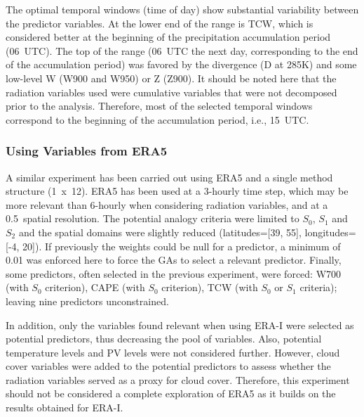 \documentclass[draft]{agujournal2019}
\begin{document}
The optimal temporal windows (time of day) show substantial variability between the predictor variables. At the lower end of the range is TCW, which is considered better at the beginning of the precipitation accumulation period (06~UTC). The top of the range (06~UTC the next day, corresponding to the end of the accumulation period) was favored by the divergence (D at 285\degree K) and some low-level W (W900 and W950) or Z (Z900). It should be noted here that the radiation variables used were cumulative variables that were not decomposed prior to the analysis. Therefore, most of the selected temporal windows correspond to the beginning of the accumulation period, i.e., 15~UTC.


\subsubsection{Using Variables from ERA5}

A similar experiment has been carried out using ERA5 and a single method structure (1~x~12). ERA5 has been used at a 3-hourly time step, which may be more relevant than 6-hourly when considering radiation variables, and at a 0.5\degree\ spatial resolution. The potential analogy criteria were limited to $S_{0}$, $S_{1}$ and $S_{2}$ and the spatial domains were slightly reduced (latitudes=[39, 55], longitudes=[-4, 20]). If previously the weights could be null for a predictor, a minimum of 0.01 was enforced here to force the GAs to select a relevant predictor. Finally, some predictors, often selected in the previous experiment, were forced: W700 (with $S_{0}$ criterion), CAPE (with $S_{0}$ criterion), TCW (with $S_{0}$ or $S_{1}$ criteria); leaving nine predictors unconstrained.

In addition, only the variables found relevant when using ERA-I were selected as potential predictors, thus decreasing the pool of variables. Also, potential temperature levels and PV levels were not considered further. However, cloud cover variables were added to the potential predictors to assess whether the radiation variables served as a proxy for cloud cover. Therefore, this experiment should not be considered a complete exploration of ERA5 as it builds on the results obtained for ERA-I.
\end{document}
